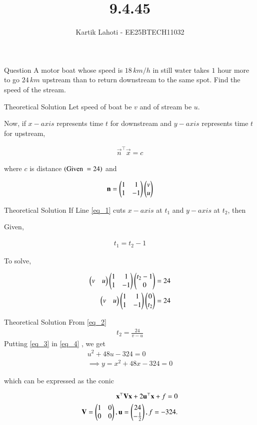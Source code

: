 \documentclass{beamer}
\title %
{9.4.45}
\author 
{Kartik Lahoti - EE25BTECH11032}
\begin{document}
\frame{\titlepage}
\begin{frame}{Question}
A motor boat whose speed is $18 \,km/h$ in still water takes $1$ hour more to go $24\,km$ upstream than to return downstream to the same spot. Find the speed of the stream.
\end{frame}

\begin{frame}{Theoretical Solution}
Let speed of boat be $v$ and of stream be $u$. 

Now, if $x-axis$ represents time $t$ for downstream and $y-axis$ represents time $t$ for upstream, 

\begin{align}
    \vec{n}^{\top}\vec{x} = c \label{eq_1}
\end{align}

where $c$ is distance $\left(\text{Given }=24\right)$ and

\begin{align}
    \mathbf{n} = \begin{pmatrix}1 & 1\\ 1 & -1\end{pmatrix}\begin{pmatrix}v \\ u\end{pmatrix}
\end{align}
\end{frame}

\begin{frame}{Theoretical Solution}
If Line \ref{eq_1} cuts $x-axis$ at $t_1$ and $y-axis$ at $t_2$, then 

Given,

\begin{align}
    t_1 = t_2 - 1
\end{align}

To solve, 

\begin{align}
    \begin{pmatrix}v & u\end{pmatrix}\begin{pmatrix}1&1\\1&-1\end{pmatrix}\begin{pmatrix}t_2-1\\0\end{pmatrix} &= 24 \label{eq_4} \\
    \begin{pmatrix}v & u\end{pmatrix}\begin{pmatrix}1&1\\1&-1\end{pmatrix}\begin{pmatrix}0\\t_2\end{pmatrix} &= 24  \label{eq_2}
\end{align}
\end{frame}

\begin{frame}{Theoretical Solution}
From \ref{eq_2}
\begin{align}
    t_2 = \frac{24}{v-u} \label{eq_3}
\end{align}
Putting \ref{eq_3} in \ref{eq_4} , we get
\begin{align}
    u^2 + 48u - 324 = 0 \\
    \implies y = x^2 + 48x - 324 = 0 
\end{align}

which can be expressed as the conic

\begin{align}
    \mathbf{x}^{\top}\mathbf{V}\mathbf{x} + 2\mathbf{u}^{\top}\mathbf{x} + f = 0 \label{eq_5}\\ 
    \mathbf{V} = \begin{pmatrix}1 & 0 \\ 0 & 0 \end{pmatrix} , \mathbf{u} = \begin{pmatrix}24 \\ -\frac{1}{2}\end{pmatrix} , f = -324.
\end{align}
\end{frame}
\end{document}
